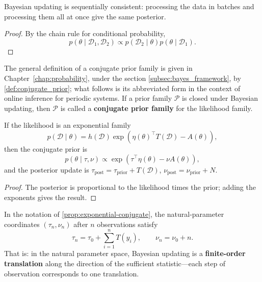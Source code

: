 \begin{proposition}\label{prop:bayes-sequential}
Bayesian updating is sequentially consistent: processing the data in batches and processing them all at once give the same posterior.
\end{proposition}

\begin{proof}
By the chain rule for conditional probability,
\[
p(\theta\mid\mathcal{D}_1,\mathcal{D}_2)
\propto p(\mathcal{D}_2\mid\theta)p(\theta\mid\mathcal{D}_1).
\]
\end{proof}

\begin{definition}\label{def:conjugate-prior-ps}
The general definition of a conjugate prior family is given in Chapter~\ref{chap:probability}, under the section \cref{subsec:bayes_framework}, by \cref{def:conjugate_prior}; what follows is its abbreviated form in the context of online inference for periodic systems.
If a prior family $\mathcal{P}$ is closed under Bayesian updating, then $\mathcal{P}$ is called a \textbf{conjugate prior family} for the likelihood family.
\end{definition}

\begin{proposition}\label{prop:exponential-conjugate}
If the likelihood is an exponential family
\[
p(\mathcal{D}\mid\theta)=h(\mathcal{D})\exp(\eta(\theta)^\top T(\mathcal{D})-A(\theta)),
\]
then the conjugate prior is
\[
p(\theta\mid\tau,\nu)\propto\exp(\tau^\top\eta(\theta)-\nu A(\theta)),
\]
and the posterior update is $\tau_{\text{post}}=\tau_{\text{prior}}+T(\mathcal{D})$, $\nu_{\text{post}}=\nu_{\text{prior}}+N$.
\end{proposition}

\begin{proof}
The posterior is proportional to the likelihood times the prior; adding the exponents gives the result.
\end{proof}

\begin{corollary}\label{cor:ps_natural_param_translation}
In the notation of \cref{prop:exponential-conjugate}, the natural-parameter coordinates $(\tau_n,\nu_n)$ after $n$ observations satisfy
\[
\tau_n = \tau_0 + \sum_{i=1}^n T(y_i), \qquad \nu_n = \nu_0 + n.
\]
That is: in the natural parameter space, Bayesian updating is a \textbf{finite-order translation} along the direction of the sufficient statistic---each step of observation corresponds to one translation.
\end{corollary}

